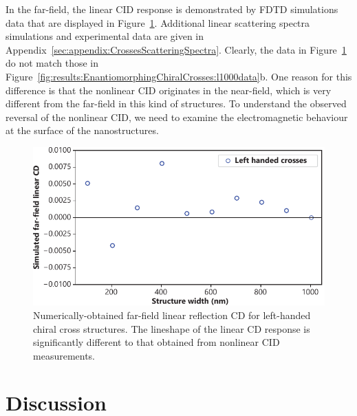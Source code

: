In the far-field, the linear CID response is demonstrated by FDTD simulations data that are displayed in Figure~\ref{fig:results:EnantiomorphingChiralCrosses:reflectionsim}. Additional linear scattering spectra simulations and experimental data are given in Appendix~\ref{sec:appendix:CrossesScatteringSpectra}. Clearly, the data in Figure~\ref{fig:results:EnantiomorphingChiralCrosses:reflectionsim} do not match those in Figure~\ref{fig:results:EnantiomorphingChiralCrosses:l1000data}b. One reason for this difference is that the nonlinear CID originates in the near-field, which is very different from the far-field in this kind of structures. To understand the observed reversal of the nonlinear CID, we need to examine the electromagnetic behaviour at the surface of the nanostructures. 

\begin{figure}[htb!]	
    \centering	
    \includegraphics[scale=1]{./figures/results/EnantiomorphingChiralCrosses/reflection_sim.pdf}
    \caption{\label{fig:results:EnantiomorphingChiralCrosses:reflectionsim}
    Numerically-obtained far-field linear reflection CD for left-handed chiral cross structures. The lineshape of the linear CD response is significantly different to that obtained from nonlinear CID measurements.}	
\end{figure}

\section{Discussion}\label{sec:results:EnantiomorphingChiralCrosses:discussion}

